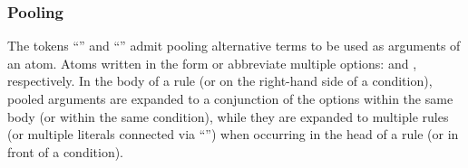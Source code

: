 
\subsubsection{Pooling}\label{subsec:gringo:pool}

The tokens ``\code{;}'' and ``\code{;;}'' admit pooling alternative terms
to be used as arguments of an atom. %
Atoms written in the form 
or  abbreviate multiple options:
 and
, respectively.
In the body of a rule (or on the right-hand side of a condition),
pooled arguments are expanded to a conjunction
of the options within the same body (or within the same condition),
while they are expanded to multiple rules (or multiple literals connected via ``\code{,}'')
when occurring in the head of a rule (or in front of a condition).

